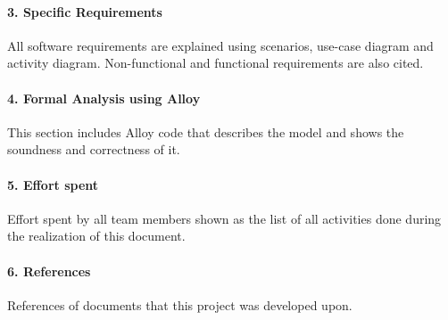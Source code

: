 \documentclass[../rasd.tex]{subfiles}
\begin{document}
		\paragraph{3. Specific Requirements}
		All software requirements are explained using scenarios, use-case diagram and activity diagram. Non-functional and functional requirements are also cited.
		\paragraph{4. Formal Analysis using Alloy}
		This section includes Alloy code that describes the model and shows the soundness and correctness of it.
		\paragraph{5. Effort spent}
		Effort spent by all team members shown as the list of all activities done during the realization of this document.
		\paragraph{6. References}
		References of documents that this project was developed upon.

		
\end{document}
